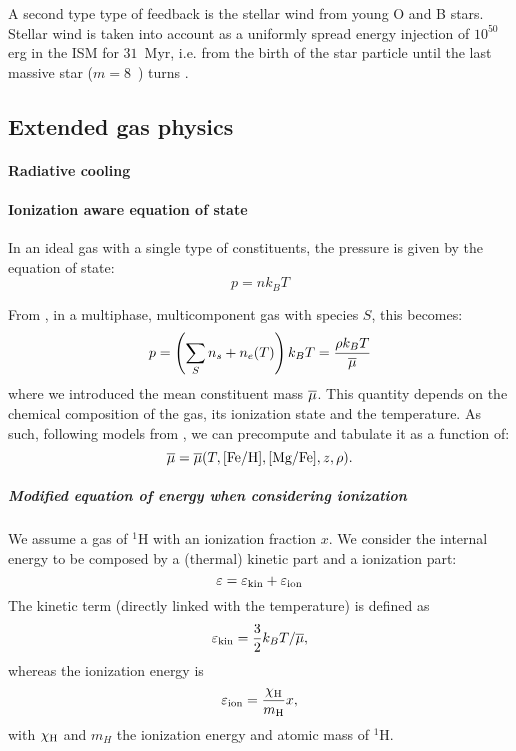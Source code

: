 A second type type of feedback is the stellar wind from young O and B stars.
Stellar wind is taken into account as a uniformly spread energy injection of $10^{50}$ erg in the ISM for $31$~Myr, i.e. from the birth of the star particle until the last massive star ($m = 8$~\Msun) turns \snii{}.



\subsection{Extended gas physics}
\label{sec:extended_gas_physics}
\paragraph{Radiative cooling}
\citep{DeRijcke2013}
\paragraph{Ionization aware equation of state}
In an ideal gas with a single type of constituents, the pressure is given by the equation of state:
\begin{equation}
p = n k_B T
\end{equation}

From \citep[p. 161]{Vandenbroucke2016}, in a multiphase, multicomponent gas with species $S$, this becomes:
\begin{equation}
p = \left(\sum_S n_s + n_e(T)\right) k_BT =\frac{\rho k_B T}{\overline{\mu}}
\end{equation}
where we introduced the mean constituent mass $\overline{\mu}$.
This quantity depends on the chemical composition of the gas, its ionization state and the temperature.
As such, following models from \citet{DeRijcke2013}, we can precompute and tabulate it as a function of:
\[\overline{\mu} = \overline{\mu}(T, [\text{Fe}/\text{H}], [\text{Mg}/\text{Fe}], z, \rho).\]

\subparagraph{Modified equation of energy when considering ionization}
We assume a gas of ${}^1$H with an ionization fraction $x$.
We consider the internal energy to be composed by a (thermal) kinetic part and a ionization part:
\begin{equation}
\label{eq:energy}
\varepsilon = \varepsilon_\text{kin} + \varepsilon_\text{ion}
\end{equation}
The kinetic term (directly linked with the temperature) is defined as
\begin{equation}
\varepsilon_\text{kin} = \frac 3 2 k_B T/ \overline{\mu}, 
\end{equation}
whereas the ionization energy is
\begin{equation}
\label{eq:energy_ion}
\varepsilon_\text{ion} = \dfrac{\chi_\text H}{m_\text H} x,
\end{equation}
with $\chi_\text H$ and $m_H$ the ionization energy and atomic mass of ${}^1$H.


